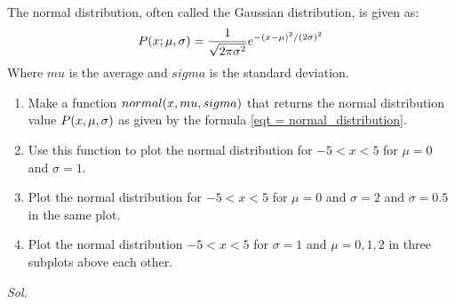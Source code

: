     \begin{problem}\label{problem_2.5}
        The normal distribution, often called the Gaussian distribution, is given as:
        \begin{equation} \label{eqt = normal_distribution}
            P\qty(x;\mu,\sigma) = \frac{1}{\sqrt{2\pi\sigma^{2}}} e^{-\qty(x-\mu)^{2} / \qty(2\sigma)^2}
        \end{equation}
        Where $mu$ is the average and $sigma$ is the standard deviation.
        \begin{enumerate}
            \item Make a function $normal\qty(x,mu,sigma)$ that returns the normal distribution value $P\qty(x,\mu,\sigma)$ as given by the formula \ref{eqt = normal_distribution}.
            \item Use this function to plot the normal distribution for $-5<x<5$ for $\mu=0$ and $\sigma=1$.
            \item Plot the normal distribution for $-5<x<5$ for $\mu=0$ and $\sigma=2$ and $\sigma=0.5$ in the same plot.
            \item Plot the normal distribution $-5<x<5$ for $\sigma=1$ and $\mu=0,1,2$ in three subplots above each other.
        \end{enumerate}
    \end{problem}
    \textit{ Sol. }
    
